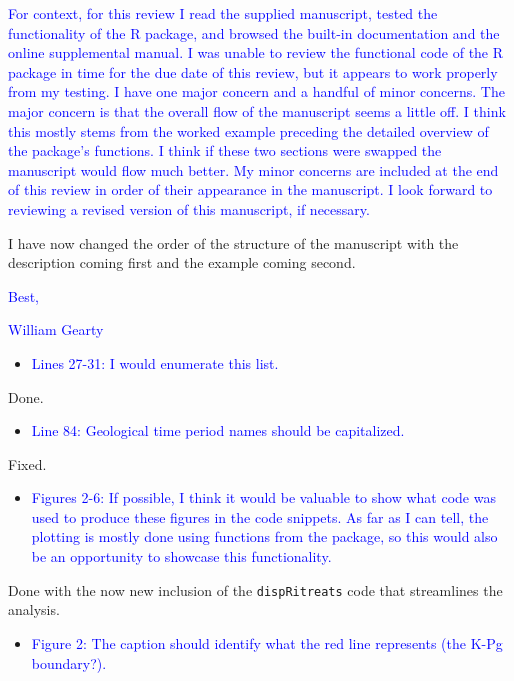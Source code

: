 \documentclass[
]{article}
\providecommand{\tightlist}{%
  \setlength{\itemsep}{0pt}\setlength{\parskip}{0pt}}
\begin{document}
\textcolor{blue}{For context, for this review I read the supplied manuscript, tested the
functionality of the R package, and browsed the built-in documentation
and the online supplemental manual. I was unable to review the
functional code of the R package in time for the due date of this
review, but it appears to work properly from my testing. I have one
major concern and a handful of minor concerns. The major concern is that
the overall flow of the manuscript seems a little off. I think this
mostly stems from the worked example preceding the detailed overview of
the package's functions. I think if these two sections were swapped the
manuscript would flow much better. My minor concerns are included at the
end of this review in order of their appearance in the manuscript. I
look forward to reviewing a revised version of this manuscript, if
necessary.}

I have now changed the order of the structure of the manuscript with the
description coming first and the example coming second.

\textcolor{blue}{Best,}

\textcolor{blue}{William Gearty}

\begin{itemize}
\tightlist
\item
  \textcolor{blue}{Lines 27-31: I would enumerate this list.}
\end{itemize}

Done.

\begin{itemize}
\tightlist
\item
  \textcolor{blue}{Line 84: Geological time period names should be capitalized.}
\end{itemize}

Fixed.

\begin{itemize}
\tightlist
\item
  \textcolor{blue}{Figures 2-6: If possible, I think it would be valuable to show what
  code was used to produce these figures in the code snippets. As far as
  I can tell, the plotting is mostly done using functions from the
  package, so this would also be an opportunity to showcase this
  functionality.}
\end{itemize}

Done with the now new inclusion of the \texttt{dispRitreats} code that
streamlines the analysis.

\begin{itemize}
\tightlist
\item
  \textcolor{blue}{Figure 2: The caption should identify what the red line represents
  (the K-Pg boundary?).}
\end{itemize}
\end{document}
